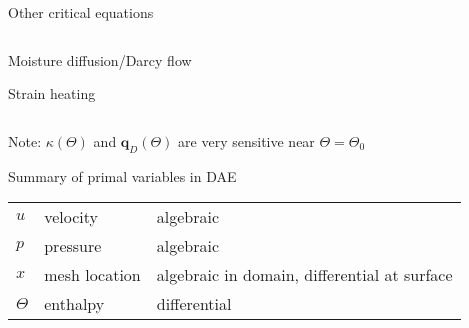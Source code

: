 \begin{frame}{Other critical equations}
\begin{itemize}
\begin{itemize}
\begin{columns}
    \begin{column}{0.4\textwidth}
    \item {\color{magenta!70!black} Moisture diffusion/Darcy flow}
    \item {\color{cyan!70!black} Strain heating}
    \end{column}
  \end{columns}
\end{itemize}
\vspace{0.3em}
    Note: $\kappa(\Theta)$ and $\bm q_D(\Theta)$ are very sensitive near $\Theta=\Theta_0$
\end{itemize}
\vspace{-.6em}
\begin{block}{Summary of primal variables in DAE}
  \begin{tabular}{lll}
    $u$ & velocity & algebraic \\
    $p$ & pressure & algebraic \\
    $x$ & mesh location & algebraic in domain, differential at surface \\
    $\Theta$ & enthalpy & differential
  \end{tabular}
\end{block}
\end{frame}
